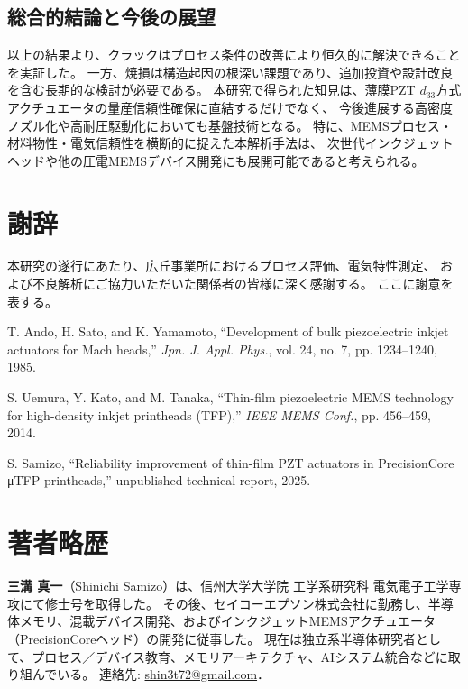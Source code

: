 \documentclass[conference]{IEEEtran}
\begin{document}
\subsection{総合的結論と今後の展望}
以上の結果より、クラックはプロセス条件の改善により恒久的に解決できることを実証した。
一方、焼損は構造起因の根深い課題であり、追加投資や設計改良を含む長期的な検討が必要である。
本研究で得られた知見は、薄膜PZT $d_{33}$方式アクチュエータの量産信頼性確保に直結するだけでなく、
今後進展する高密度ノズル化や高耐圧駆動化においても基盤技術となる。
特に、MEMSプロセス・材料物性・電気信頼性を横断的に捉えた本解析手法は、
次世代インクジェットヘッドや他の圧電MEMSデバイス開発にも展開可能であると考えられる。

\section*{謝辞}
本研究の遂行にあたり、広丘事業所におけるプロセス評価、電気特性測定、  
および不良解析にご協力いただいた関係者の皆様に深く感謝する。  
ここに謝意を表する。

\begin{thebibliography}{99}

T. Ando, H. Sato, and K. Yamamoto, 
``Development of bulk piezoelectric inkjet actuators for Mach heads,'' 
\textit{Jpn. J. Appl. Phys.}, vol. 24, no. 7, pp. 1234--1240, 1985.

S. Uemura, Y. Kato, and M. Tanaka, 
``Thin-film piezoelectric MEMS technology for high-density inkjet printheads (TFP),'' 
\textit{IEEE MEMS Conf.}, pp. 456--459, 2014.

S. Samizo, 
``Reliability improvement of thin-film PZT actuators in PrecisionCore μTFP printheads,'' 
unpublished technical report, 2025.

\end{thebibliography}

\section*{著者略歴}
\textbf{三溝 真一}（Shinichi Samizo）は、信州大学大学院 工学系研究科 電気電子工学専攻にて修士号を取得した。  
その後、セイコーエプソン株式会社に勤務し、半導体メモリ、混載デバイス開発、およびインクジェットMEMSアクチュエータ（PrecisionCoreヘッド）の開発に従事した。  
現在は独立系半導体研究者として、プロセス／デバイス教育、メモリアーキテクチャ、AIシステム統合などに取り組んでいる。  
連絡先: \href{mailto:shin3t72@gmail.com}{shin3t72@gmail.com}．
\end{document}
